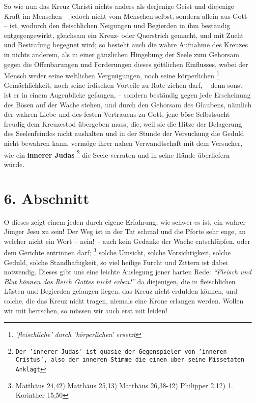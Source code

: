 \medskip

So wie nun das Kreuz Christi nichts anders als derjenige Geist und diejenige
Kraft im Menschen -- jedoch nicht vom Menschen selbst, sondern allein aus Gott --
ist, wodurch den fleischlichen Neigungen und Begierden in ihm beständig
entgegengewirkt, gleichsam ein Kreuz- oder Querstrich gemacht, und mit Zucht und
Bestrafung begegnet wird; so besteht auch die wahre Aufnahme des Kreuzes in
nichts anderem, als in einer gänzlichen Hingebung der Seele zum Gehorsam gegen
die Offenbarungen und Forderungen dieses göttlichen Einflusses, wobei der Mensch
weder seine weltlichen Vergnügungen, noch seine körperlichen \footnote{\textit{'fleischliche' durch 'körperlichen' ersetzt}} Gemächlichkeit,
noch seine irdischen Vorteile zu Rate ziehen darf, -- denn sonst ist er in
einem Augenblicke gefangen, -- sondern beständig gegen jede Erscheinung des
Bösen auf der Wache stehen, und durch den Gehorsam des Glaubens, nämlich der
wahren Liebe und des festen Vertrauens zu Gott, jene böse Selbstsucht freudig
dem Kreuzestod übergeben muss, die, weil sie die Hitze der Belagerung des
Seelenfeindes nicht aushalten und in der Stunde der Versuchung die Geduld nicht
bewahren kann, vermöge ihrer nahen Verwandtschaft mit dem Versucher, wie ein
\textbf{innerer Judas}
\footnote{\texttt{Der 'innerer Judas' ist quasie der Gegenspieler von 'inneren Cristus', also der inneren Stimme die einen über seine Missetaten Anklagt}} 
die Seele verraten und in seine Hände überliefern würde.



\section{6. Abschnitt} \label{kap3_ab6}

O dieses zeigt einem jeden durch eigene Erfahrung, wie schwer es ist, ein wahrer
Jünger Jesu zu sein! Der Weg ist in der Tat schmal und die Pforte sehr enge, an
welcher nicht ein Wort -- nein! -- auch kein Gedanke der Wache entschlüpfen, oder
dem Gerichte entrinnen darf;
\footnote{Matthäus 24,42) Matthäus 25,13) Matthäus 26,38-42)
Philipper 2,12) 1. Korinther 15,50}
solche Umsicht, solche Vorsichtigkeit, solche Geduld,
solche Standhaftigkeit, so viel heilige Furcht und Zittern ist dabei notwendig.
Dieses gibt uns eine leichte Auslegung jener harten Rede:
\textit{"`Fleisch und Blut können das Reich Gottes nicht erben!"'}
da diejenigen, die in fleischlichen
Lüsten und Begierden gefangen liegen, das Kreuz nicht erdulden können, und
solche, die das Kreuz nicht tragen, niemals eine Krone erlangen werden. Wollen
wir mit herrschen, so müssen wir auch erst mit leiden!


